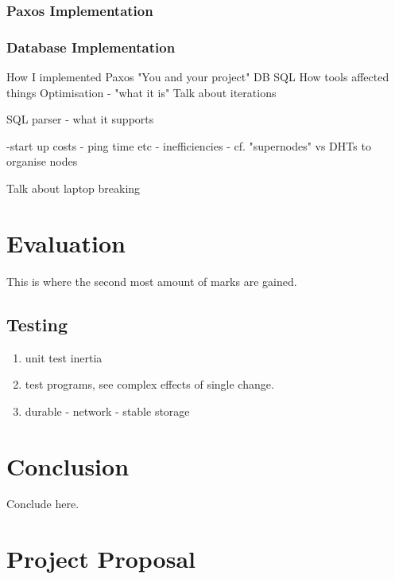 \documentclass[12pt,twoside,notitlepage]{report}
\begin{document}
\subsection{Paxos Implementation}

\subsection{Database Implementation}

How I implemented Paxos
"You and your project"
DB
SQL
How tools affected things
Optimisation - "what it is"
Talk about iterations

SQL parser
- what it supports

-start up costs
  - ping time etc
  - inefficiencies
  - cf. "supernodes" vs DHTs to organise nodes

Talk about laptop breaking


\cleardoublepage
\chapter{Evaluation}

This is where the second most amount of marks are gained.

\section{Testing}

\begin{enumerate}
	\item unit test inertia
	\item test programs, see complex effects of single change.
	\item durable - network - stable storage
\end{enumerate}



\cleardoublepage
\chapter{Conclusion}

Conclude here.




\cleardoublepage



\cleardoublepage

\appendix

\chapter{Project Proposal}


\end{document}
